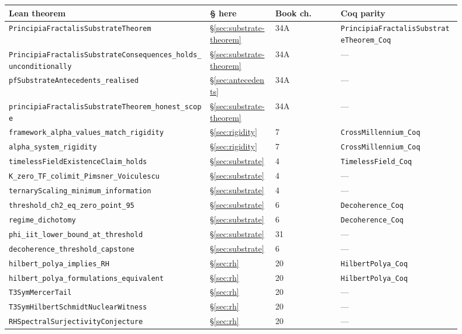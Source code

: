 \documentclass[11pt,a4paper]{article}
\theoremstyle{definition}
\theoremstyle{remark}
\newcommand{\lean}[1]{\texttt{\small #1}}
\begin{document}
\begin{longtable}{p{0.40\linewidth} p{0.13\linewidth} p{0.13\linewidth} p{0.24\linewidth}}
\toprule
\textbf{Lean theorem} & \textbf{\S{} here} & \textbf{Book ch.} & \textbf{Coq parity} \\
\midrule
\endhead
\lean{PrincipiaFractalisSubstrateTheorem} & \S\ref{sec:substrate-theorem} & 34A & \lean{PrincipiaFractalisSubstrateTheorem\_Coq} \\
\lean{PrincipiaFractalisSubstrateConsequences\_holds\_unconditionally} & \S\ref{sec:substrate-theorem} & 34A & --- \\
\lean{pfSubstrateAntecedents\_realised} & \S\ref{sec:antecedents} & 34A & --- \\
\lean{principiaFractalisSubstrateTheorem\_honest\_scope} & \S\ref{sec:substrate-theorem} & 34A & --- \\
\lean{framework\_alpha\_values\_match\_rigidity} & \S\ref{sec:rigidity} & 7 & \lean{CrossMillennium\_Coq} \\
\lean{alpha\_system\_rigidity} & \S\ref{sec:rigidity} & 7 & \lean{CrossMillennium\_Coq} \\
\lean{timelessFieldExistenceClaim\_holds} & \S\ref{sec:substrate} & 4 & \lean{TimelessField\_Coq} \\
\lean{K\_zero\_TF\_colimit\_Pimsner\_Voiculescu} & \S\ref{sec:substrate} & 4 & --- \\
\lean{ternaryScaling\_minimum\_information} & \S\ref{sec:substrate} & 4 & --- \\
\lean{threshold\_ch2\_eq\_zero\_point\_95} & \S\ref{sec:substrate} & 6 & \lean{Decoherence\_Coq} \\
\lean{regime\_dichotomy} & \S\ref{sec:substrate} & 6 & \lean{Decoherence\_Coq} \\
\lean{phi\_iit\_lower\_bound\_at\_threshold} & \S\ref{sec:substrate} & 31 & --- \\
\lean{decoherence\_threshold\_capstone} & \S\ref{sec:substrate} & 6 & --- \\
\lean{hilbert\_polya\_implies\_RH} & \S\ref{sec:rh} & 20 & \lean{HilbertPolya\_Coq} \\
\lean{hilbert\_polya\_formulations\_equivalent} & \S\ref{sec:rh} & 20 & \lean{HilbertPolya\_Coq} \\
\lean{T3SymMercerTail} & \S\ref{sec:rh} & 20 & --- \\
\lean{T3SymHilbertSchmidtNuclearWitness} & \S\ref{sec:rh} & 20 & --- \\
\lean{RHSpectralSurjectivityConjecture} & \S\ref{sec:rh} & 20 & --- \\

\end{longtable}
\end{document}
